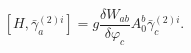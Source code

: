 \begin{equation}
\left[ H,\bar{\gamma}_{a}^{(2)i}\right] =g\frac{\delta W_{ab}}{\delta
\varphi _{c}}A_{0}^{b}\bar{\gamma}_{c}^{(2)i}.  \label{i39}
\end{equation}

